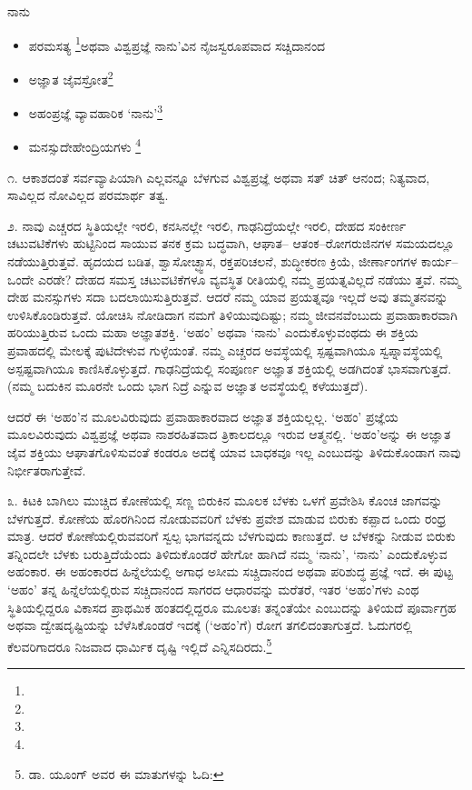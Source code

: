 \begin{center}
ನಾನು
\end{center}

\begin{itemize}
\item ಪರಮಸತ್ಯ \footnote{}ಅಥವಾ ವಿಶ್ವಪ್ರಜ್ಞೆ ನಾನು’ವಿನ ನೈಜಸ್ವರೂಪವಾದ ಸಚ್ಚಿದಾನಂದ

 \item ಅಜ್ಞಾತ ಜೈವಸ್ರೋತ\footnote{}

 \item ಅಹಂಪ್ರಜ್ಞೆ ವ್ಯಾವಹಾರಿಕ ‘ನಾನು’\footnote{}

 \item ಮನಸ್ಸುದೇಹೇಂದ್ರಿಯಗಳು \footnote{}

\end{itemize}

೧. ಆಕಾಶದಂತೆ ಸರ್ವವ್ಯಾಪಿಯಾಗಿ ಎಲ್ಲವನ್ನೂ ಬೆಳಗುವ ವಿಶ್ವಪ್ರಜ್ಞೆ ಅಥವಾ ಸತ್ ಚಿತ್ ಆನಂದ; ನಿತ್ಯವಾದ, ಸಾವಿಲ್ಲದ ನೋವಿಲ್ಲದ ಪರಮಾರ್ಥ ತತ್ವ.

೨. ನಾವು ಎಚ್ಚರದ ಸ್ಥಿತಿಯಲ್ಲೇ ಇರಲಿ, ಕನಸಿನಲ್ಲೇ ಇರಲಿ, ಗಾಢನಿದ್ರೆಯಲ್ಲೇ ಇರಲಿ, ದೇಹದ ಸಂಕೀರ್ಣ ಚಟುವಟಿಕೆಗಳು ಹುಟ್ಟಿನಿಂದ ಸಾಯುವ ತನಕ ಕ್ರಮ ಬದ್ಧವಾಗಿ, ಆಘಾತ– ಆತಂಕ–ರೋಗರುಜಿನಗಳ ಸಮಯದಲ್ಲೂ ನಡೆಯುತ್ತಿರುತ್ತವೆ. ಹೃದಯದ ಬಡಿತ, ಶ್ವಾಸೋ\-ಚ್ಛ್ವಾಸ, ರಕ್ತಪರಿಚಲನೆ, ಶುದ್ಧೀಕರಣ ಕ್ರಿಯೆ, ಜೀರ್ಣಾಂಗಗಳ ಕಾರ್ಯ–ಒಂದೇ ಎರಡೇ? ದೇಹದ ಸಮಸ್ತ ಚಟುವಟಿಕೆಗಳೂ ವ್ಯವಸ್ಥಿತ ರೀತಿಯಲ್ಲಿ ನಮ್ಮ ಪ್ರಯತ್ನವಿಲ್ಲದೆ ನಡೆಯು ತ್ತವೆ. ನಮ್ಮ ದೇಹ ಮನಸ್ಸುಗಳು ಸದಾ ಬದಲಾಯಿಸುತ್ತಿರುತ್ತವೆ. ಆದರೆ ನಮ್ಮ ಯಾವ ಪ್ರಯತ್ನವೂ ಇಲ್ಲದೆ ಅವು ತಮ್ಮತನವನ್ನು ಉಳಿಸಿಕೊಂಡಿರುತ್ತವೆ. ಯೋಚಿಸಿ ನೋಡಿದಾಗ ನಮಗೆ ತಿಳಿಯುವುದಿಷ್ಟು; ನಮ್ಮ ಜೀವನವೆಂಬುದು ಪ್ರವಾಹಾಕಾರವಾಗಿ ಹರಿಯುತ್ತಿರುವ ಒಂದು ಮಹಾ ಅಜ್ಞಾತಶಕ್ತಿ. ‘ಅಹಂ’ ಅಥವಾ ‘ನಾನು’ ಎಂದುಕೊಳ್ಳುವಂಥದು ಈ ಶಕ್ತಿಯ ಪ್ರವಾಹದಲ್ಲಿ ಮೇಲಕ್ಕೆ ಪುಟಿದೇಳುವ ಗುಳ್ಳೆಯಂತೆ. ನಮ್ಮ ಎಚ್ಚರದ ಅವಸ್ಥೆಯಲ್ಲಿ ಸ್ಪಷ್ಟವಾಗಿಯೂ ಸ್ವಪ್ನಾವಸ್ಥೆಯಲ್ಲಿ ಅಸ್ಪಷ್ಟವಾಗಿಯೂ ಕಾಣಿಸಿಕೊಳ್ಳುತ್ತದೆ. ಗಾಢನಿದ್ರೆಯಲ್ಲಿ ಸಂಪೂರ್ಣ ಅಜ್ಞಾತ ಶಕ್ತಿಯಲ್ಲಿ ಅಡಗಿದಂತೆ ಭಾಸವಾಗುತ್ತದೆ. (ನಮ್ಮ ಬದುಕಿನ ಮೂರನೇ ಒಂದು ಭಾಗ ನಿದ್ರೆ ಎನ್ನುವ ಅಜ್ಞಾತ ಅವಸ್ಥೆಯಲ್ಲಿ ಕಳೆಯುತ್ತದೆ).

ಆದರೆ ಈ ‘ಅಹಂ’ನ ಮೂಲವಿರುವುದು ಪ್ರವಾಹಾಕಾರವಾದ ಅಜ್ಞಾತ ಶಕ್ತಿಯಲ್ಲಲ್ಲ. ‘ಅಹಂ’ ಪ್ರಜ್ಞೆಯ ಮೂಲವಿರುವುದು ವಿಶ್ವಪ್ರಜ್ಞೆ ಅಥವಾ ನಾಶರಹಿತವಾದ ತ್ರಿಕಾಲದಲ್ಲೂ ಇರುವ ಆತ್ಮನಲ್ಲಿ. ‘ಅಹಂ’ಅನ್ನು ಈ ಅಜ್ಞಾತ ಜೈವ ಶಕ್ತಿಯು ಆಘಾತಗೊಳಿಸುವಂತೆ ಕಂಡರೂ ಅದಕ್ಕೆ ಯಾವ ಬಾಧಕವೂ ಇಲ್ಲ ಎಂಬುದನ್ನು ತಿಳಿದುಕೊಂಡಾಗ ನಾವು ನಿರ್ಭೀತರಾಗುತ್ತೇವೆ.

೩. ಕಿಟಕಿ ಬಾಗಿಲು ಮುಚ್ಚಿದ ಕೋಣೆಯಲ್ಲಿ ಸಣ್ಣ ಬಿರುಕಿನ ಮೂಲಕ ಬೆಳಕು ಒಳಗೆ ಪ್ರವೇಶಿಸಿ ಕೊಂಚ ಜಾಗವನ್ನು ಬೆಳಗುತ್ತದೆ. ಕೋಣೆಯ ಹೊರಗಿನಿಂದ ನೋಡುವವರಿಗೆ ಬೆಳಕು ಪ್ರವೇಶ ಮಾಡುವ ಬಿರುಕು ಕಪ್ಪಾದ ಒಂದು ರಂಧ್ರ ಮಾತ್ರ. ಆದರೆ ಕೋಣೆಯಲ್ಲಿರುವವರಿಗೆ ಸ್ವಲ್ಪ ಭಾಗವನ್ನದು ಬೆಳಗುವುದು ಕಾಣುತ್ತದೆ. ಆ ಬೆಳಕನ್ನು ನೀಡುವ ಬಿರುಕು ತನ್ನಿಂದಲೇ ಬೆಳಕು ಬರುತ್ತಿದೆಯೆಂದು ತಿಳಿದುಕೊಂಡರೆ ಹೇಗೋ ಹಾಗಿದೆ ನಮ್ಮ ‘ನಾನು’, ‘ನಾನು’ ಎಂದುಕೊಳ್ಳುವ ಅಹಂಕಾರ. ಈ ಅಹಂಕಾರದ ಹಿನ್ನೆಲೆಯಲ್ಲಿ ಅಗಾಧ ಅಸೀಮ ಸಚ್ಚಿದಾನಂದ ಅಥವಾ ಪರಿಶುದ್ಧ ಪ್ರಜ್ಞೆ ಇದೆ. ಈ ಪುಟ್ಟ ‘ಅಹಂ’ ತನ್ನ ಹಿನ್ನೆಲೆಯಲ್ಲಿರುವ ಸಚ್ಚಿದಾನಂದ ಸಾಗರದ ಆಧಾರವನ್ನು ಮರೆತರೆ, ಇತರ ‘ಅಹಂ’ಗಳು ಎಂಥ ಸ್ಥಿತಿಯಲ್ಲಿದ್ದರೂ ವಿಕಾಸದ ಪ್ರಾಥಮಿಕ ಹಂತದಲ್ಲಿದ್ದರೂ ಮೂಲತಃ ತನ್ನಂತೆಯೇ ಎಂಬುದನ್ನು ತಿಳಿಯದೆ ಪೂರ್ವಾಗ್ರಹ ಅಥವಾ ದ್ವೇಷದೃಷ್ಟಿಯನ್ನು ಬೆಳೆಸಿಕೊಂಡರೆ ಇದಕ್ಕೆ (‘ಅಹಂ’ಗೆ) ರೋಗ ತಗಲಿದಂತಾಗುತ್ತದೆ. ಓದುಗರಲ್ಲಿ ಕೆಲವರಿಗಾದರೂ ನಿಜವಾದ ಧಾರ್ಮಿಕ ದೃಷ್ಟಿ ಇಲ್ಲಿದೆ ಎನ್ನಿಸದಿರದು.\footnote{ ಡಾ. ಯೂಂಗ್ ಅವರ ಈ ಮಾತುಗಳನ್ನು ಓದಿ: \hfill{}}


